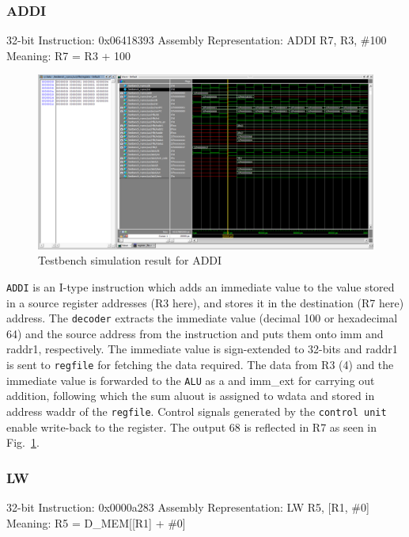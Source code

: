 \subsubsection*{ADDI}
\label{sect6_4_3_2b}

32-bit Instruction: 0x06418393 \newline
Assembly Representation: ADDI R7, R3, \#100
Meaning: R7 = R3 + 100

\begin{figure}[h!]
\centering
\includegraphics[width=12cm]{figures/RISCV_Implementation_ADDI.PNG}
\caption{Testbench simulation result for ADDI}
\label{fig:riscv9}
\end{figure}

\verb|ADDI| is an I-type instruction which adds an immediate value to the value stored in a source register addresses (R3 here), and stores it in the destination (R7 here) address. The \verb|decoder| extracts the immediate value (decimal 100 or hexadecimal  64) and the source address from the instruction and puts them onto imm and raddr1, respectively. The immediate value is sign-extended to 32-bits and raddr1 is sent to \verb|regfile| for fetching the data required. The data from R3 (4) and the immediate value is forwarded to the \verb|ALU| as a and imm\_ext for carrying out addition, following which the sum aluout is assigned to wdata and stored in address waddr of the \verb|regfile|. Control signals generated by the \verb|control unit| enable write-back to the register. The output 68 is reflected in R7 as seen in Fig.~\ref{fig:riscv9}.

\subsubsection*{LW}
\label{sect6_4_3_2c}

32-bit Instruction: 0x0000a283 \newline
Assembly Representation: LW R5, [R1, \#0] \newline
Meaning: R5 = D\_MEM[[R1] + \#0]

